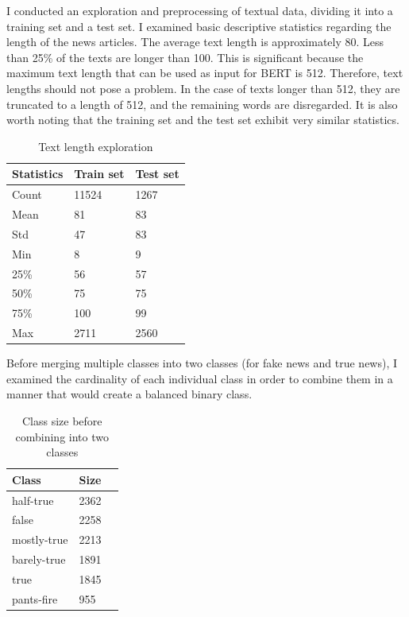 I conducted an exploration and preprocessing of textual data, dividing it into a training set and a test set. I examined basic descriptive statistics regarding the length of the news articles. The average text length is approximately 80. Less than 25\% of the texts are longer than 100. This is significant because the maximum text length that can be used as input for BERT is 512. Therefore, text lengths should not pose a problem. In the case of texts longer than 512, they are truncated to a length of 512, and the remaining words are disregarded. It is also worth noting that the training set and the test set exhibit very similar statistics.

\begin{table}[!htbp]
\centering
{
\makegapedcells
\begin{tabular}{l|ll}
Statistics & Train set & Test set \\ \hline
Count & 11524 & 1267 \\ 
Mean  & 81   & 83  \\ 
Std   & 47    & 83   \\
Min   & 8    & 9   \\
25\%  & 56    & 57   \\
50\%  & 75    & 75   \\
75\%  & 100   & 99  \\
Max   & 2711  & 2560
\end{tabular}
}
\caption{Text length exploration}
\label{text_length}
\end{table}

Before merging multiple classes into two classes (for fake news and true news), I examined the cardinality of each individual class in order to combine them in a manner that would create a balanced binary class.

\begin{table}[!htbp]
\centering
{
\makegapedcells
\begin{tabular}{l|ll}
Class & Size \\ \hline
half-true   & 2362 \\
false       & 2258 \\
mostly-true & 2213 \\
barely-true & 1891 \\
true        & 1845 \\
pants-fire  & 955 
\end{tabular}
}
\caption{Class size before combining into two classes}
\label{class_size}
\end{table}


